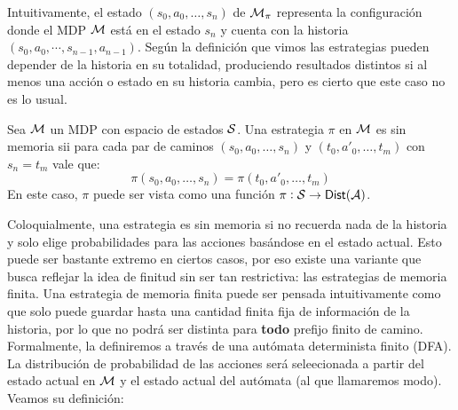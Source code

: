 
Intuitivamente, el estado $(s_0, a_0, \dots, s_n)$ de $\mathcal{M}_\pi$ representa la
configuración donde el MDP $\mathcal{M}$ está en el estado $s_n$ y cuenta con la
historia $(s_0, a_0, \cdots, s_{n-1}, a_{n-1})$. Según la definición que vimos
las estrategias pueden depender de la historia en su totalidad, produciendo
resultados distintos si al menos una acción o estado en su historia cambia,
pero es cierto que este caso no es lo usual.

\begin{definition}
	Sea $\mathcal{M}$ un MDP con espacio de estados $\mathcal{S}$. Una estrategia $\pi$ en $\mathcal{M}$ es sin memoria sii para cada par de caminos $(s_0, a_0, \dots, s_n)$ y $(t_0, a'_0, \dots, t_m)$ con $s_n = t_m$ vale que:
	$$\pi(s_0, a_0, \dots, s_n) = \pi(t_0, a'_0, \dots, t_m)$$
	En este caso, $\pi$ puede ser vista como una función $\pi : \mathcal{S} \rightarrow \mathsf{Dist}(\mathcal{A})$.
\end{definition}

Coloquialmente, una estrategia es sin memoria si no recuerda nada de la
historia y solo elige probabilidades para las acciones basándose en el estado
actual. Esto puede ser bastante extremo en ciertos casos, por eso existe una
variante que busca reflejar la idea de finitud sin ser tan restrictiva: las
estrategias de memoria finita. Una estrategia de memoria finita puede ser
pensada intuitivamente como que solo puede guardar hasta una cantidad finita
fija de información de la historia, por lo que no podrá ser distinta para
\textbf{todo} prefijo finito de camino. Formalmente, la definiremos a través de
una autómata determinista finito (DFA). La distribución de probabilidad de las
acciones será seleecionada a partir del estado actual en $\mathcal{M}$ y el estado
actual del autómata (al que llamaremos modo). Veamos su definición:

